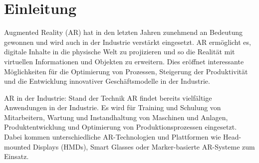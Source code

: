 \section{Einleitung}

Augmented Reality (AR) hat in den letzten Jahren zunehmend an Bedeutung
gewonnen und wird auch in der Industrie verstärkt eingesetzt. AR ermöglicht es,
digitale Inhalte in die physische Welt zu projizieren und so die Realität mit
virtuellen Informationen und Objekten zu erweitern. Dies eröffnet interessante
Möglichkeiten für die Optimierung von Prozessen, Steigerung der Produktivität
und die Entwicklung innovativer Geschäftsmodelle in der Industrie.

AR in der Industrie: Stand der Technik AR findet bereits vielfältige
Anwendungen in der Industrie. Es wird für Training und Schulung von
Mitarbeitern, Wartung und Instandhaltung von Maschinen und Anlagen,
Produktentwicklung und Optimierung von Produktionsprozessen eingesetzt. Dabei
kommen unterschiedliche AR-Technologien und Plattformen wie Head-mounted
Displays (HMDs), Smart Glasses oder Marker-basierte AR-Systeme zum Einsatz.